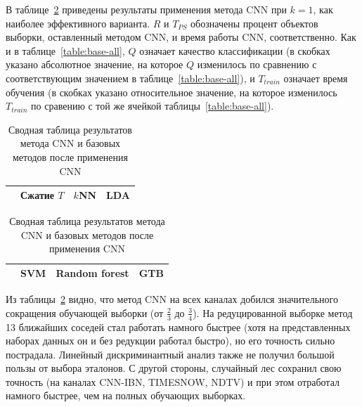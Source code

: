 В таблице~\ref{table:cnn-results} приведены результаты применения метода CNN при \(k=1\), как наиболее эффективного варианта. \(R\) и \(T_{PS}\) обозначены процент объектов выборки, оставленный методом CNN, и время работы CNN, соответственно. Как и в таблице~\ref{table:base-all}, \(Q\) означает качество классификации (в скобках указано абсолютное значение, на которое \(Q\) изменилось по сравнению с соответствующим значением в таблице~\ref{table:base-all}), и \(T_{train}\) означает время обучения (в скобках указано относительное значение, на которое изменилось \(T_{train}\) по сравению с той же ячейкой таблицы~\ref{table:base-all}).
\begin{table}[h!]
    \centering
    \begin{tabular}{|c||c||c|c|}
    \cline{2-4}
    \multicolumn{1}{c||}{} & Сжатие \(T\) & \(k\)NN & LDA \\
    \hline \hline
	
\end{tabular}
\newline \vspace*{0.5cm} \newline
\begin{tabular}{|c||c|c|c|}
    \cline{2-4}
    \multicolumn{1}{c||}{} & SVM & Random forest & GTB \\
    \hline \hline
	
    \end{tabular}
    \caption{Сводная таблица результатов метода CNN и базовых методов после применения CNN}
    \label{table:cnn-results}
\end{table}

 Из таблицы~\ref{table:cnn-results} видно, что метод CNN на всех каналах добился значительного сокращения обучающей выборки (от \(\frac23\) до \(\frac34\)). На редуцированной выборке метод 13 ближайших соседей стал работать намного быстрее (хотя на представленных наборах данных он и без редукции работал быстро), но его точность сильно пострадала. Линейный дискриминантный анализ также не получил большой пользы от выбора эталонов. С другой стороны, случайный лес сохранил свою точность (на каналах CNN-IBN, TIMESNOW, NDTV) и при этом отработал намного быстрее, чем на полных обучающих выборках.

